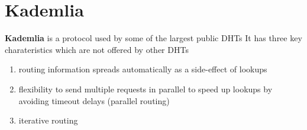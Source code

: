 \chapter{Kademlia}
\textbf{Kademlia} is a protocol used by some of the largest public DHTs
It has three key charateristics which are not offered by other DHTs
\begin{enumerate}
   \item routing information spreads automatically as a side-effect of lookups
   \item flexibility to send multiple requests in parallel to speed up lookups by
   avoiding timeout delays (parallel routing)
   \item iterative routing
\end{enumerate}

